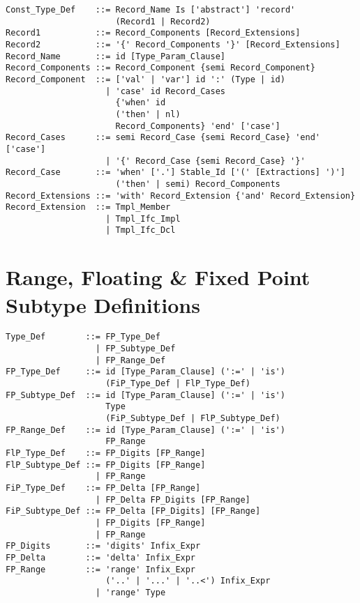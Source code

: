 \syntax\begin{lstlisting}
Const_Type_Def    ::= Record_Name Is ['abstract'] 'record'
                      (Record1 | Record2)
Record1           ::= Record_Components [Record_Extensions]
Record2           ::= '{' Record_Components '}' [Record_Extensions]
Record_Name       ::= id [Type_Param_Clause]
Record_Components ::= Record_Component {semi Record_Component}
Record_Component  ::= ['val' | 'var'] id ':' (Type | id)
                    | 'case' id Record_Cases
                      {'when' id 
                      ('then' | nl) 
                      Record_Components} 'end' ['case']
Record_Cases      ::= semi Record_Case {semi Record_Case} 'end' ['case']
                    | '{' Record_Case {semi Record_Case} '}'
Record_Case       ::= 'when' ['.'] Stable_Id ['(' [Extractions] ')']
                      ('then' | semi) Record_Components
Record_Extensions ::= 'with' Record_Extension {'and' Record_Extension}
Record_Extension  ::= Tmpl_Member
                    | Tmpl_Ifc_Impl
                    | Tmpl_Ifc_Dcl
\end{lstlisting}





\section{Range, Floating \& Fixed Point Subtype Definitions}
\label{sec:fl-fi-subtypes}

\syntax\begin{lstlisting}
Type_Def        ::= FP_Type_Def 
                  | FP_Subtype_Def 
                  | FP_Range_Def
FP_Type_Def     ::= id [Type_Param_Clause] (':=' | 'is')
                    (FiP_Type_Def | FlP_Type_Def) 
FP_Subtype_Def  ::= id [Type_Param_Clause] (':=' | 'is') 
                    Type
                    (FiP_Subtype_Def | FlP_Subtype_Def) 
FP_Range_Def    ::= id [Type_Param_Clause] (':=' | 'is') 
                    FP_Range
FlP_Type_Def    ::= FP_Digits [FP_Range]
FlP_Subtype_Def ::= FP_Digits [FP_Range]
                  | FP_Range
FiP_Type_Def    ::= FP_Delta [FP_Range] 
                  | FP_Delta FP_Digits [FP_Range]
FiP_Subtype_Def ::= FP_Delta [FP_Digits] [FP_Range]
                  | FP_Digits [FP_Range]
                  | FP_Range
FP_Digits       ::= 'digits' Infix_Expr
FP_Delta        ::= 'delta' Infix_Expr
FP_Range        ::= 'range' Infix_Expr 
                    ('..' | '...' | '..<') Infix_Expr
                  | 'range' Type
\end{lstlisting}

